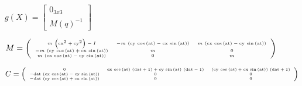 \documentclass[fleqn, a4paper, 12pt, russian]{article}
\begin{document}
$g(X) = \begin{bmatrix}
	0_{3x3}\\
	M(q)^{-1}
\end{bmatrix}$


\newpage
$\tiny{M=
\left(\begin{array}{ccc} m\,\left({\mathrm{cx}}^2+{\mathrm{cy}}^2\right)-I & -m\,\left(\mathrm{cy}\,\cos\left(\mathrm{at}\right)-\mathrm{cx}\,\sin\left(\mathrm{at}\right)\right) & m\,\left(\mathrm{cx}\,\cos\left(\mathrm{at}\right)-\mathrm{cy}\,\sin\left(\mathrm{at}\right)\right)\\ -m\,\left(\mathrm{cy}\,\cos\left(\mathrm{at}\right)+\mathrm{cx}\,\sin\left(\mathrm{at}\right)\right) & m & 0\\ m\,\left(\mathrm{cx}\,\cos\left(\mathrm{at}\right)-\mathrm{cy}\,\sin\left(\mathrm{at}\right)\right) & 0 & m \end{array}\right)
}$

$\tiny{
C=
\left(\begin{array}{ccc} 0 & \mathrm{cx}\,\cos\left(\mathrm{at}\right)\,\left(\mathrm{dat}+1\right)+\mathrm{cy}\,\sin\left(\mathrm{at}\right)\,\left(\mathrm{dat}-1\right) & \left(\mathrm{cy}\,\cos\left(\mathrm{at}\right)+\mathrm{cx}\,\sin\left(\mathrm{at}\right)\right)\,\left(\mathrm{dat}+1\right)\\ -\mathrm{dat}\,\left(\mathrm{cx}\,\cos\left(\mathrm{at}\right)-\mathrm{cy}\,\sin\left(\mathrm{at}\right)\right) & 0 & 0\\ -\mathrm{dat}\,\left(\mathrm{cy}\,\cos\left(\mathrm{at}\right)+\mathrm{cx}\,\sin\left(\mathrm{at}\right)\right) & 0 & 0 \end{array}\right)
}$
\end{document}
